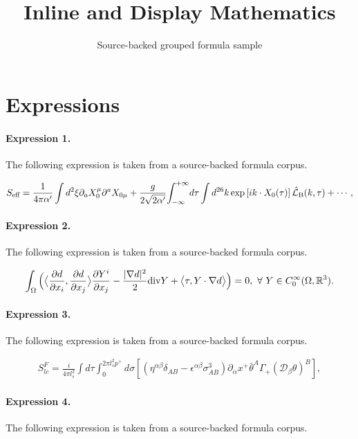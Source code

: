 \documentclass[11pt]{article}
\title{Inline and Display Mathematics}
\author{Source-backed grouped formula sample}
\date{}
\begin{document}
\maketitle
\section{Expressions}
\paragraph{Expression 1.} The following expression is taken from a source-backed formula corpus.

\begin{align*}{S_{\text{\scriptsize eff}}}={1\over{4\pi\alpha'}}\int{d^2}\xi{\partial_a}{X_0^\mu}{\partial^a}{X_{0\mu}}+{g\over{2\sqrt{2\alpha'}}}{\int_{-\infty}^{+\infty}}d\tau\int{d^{26}}k\exp\left[ik\cdot{X_0}(\tau)\right]{\hat{\mathcal{L}}_{\text{\scriptsize B}}}(k,\tau)+\cdots,\end{align*}

\paragraph{Expression 2.} The following expression is taken from a source-backed formula corpus.

\begin{align*}\int_\Omega \Big(\big\langle\frac{\partial d}{\partial x_i}, \frac{\partial d}{\partial x_j}\big\rangle \frac{\partial Y^i}{\partial x_j}-\frac{|\nabla d|^2}2 {\rm{div}}Y+\big\langle\tau, Y\cdot\nabla d\big\rangle\Big)=0,\ \forall \ Y\in C_0^\infty(\Omega,\mathbb R^3).\end{align*}

\paragraph{Expression 3.} The following expression is taken from a source-backed formula corpus.

\begin{align*}S^F_{lc} = \frac{i}{4 \pi l_s^2} \int d \tau \int_{0}^{2 \pi l_s^2 p^+} d \sigma\left[ \left( \eta^{\alpha \beta} \delta_{AB} - \epsilon^{\alpha \beta} \sigma^3_{AB} \right) \partial_\alpha x^+ \bar{\theta}^A \Gamma_+ \left( \mathcal{D}_\beta \theta \right)^B \right],\end{align*}

\paragraph{Expression 4.} The following expression is taken from a source-backed formula corpus.
\end{document}
